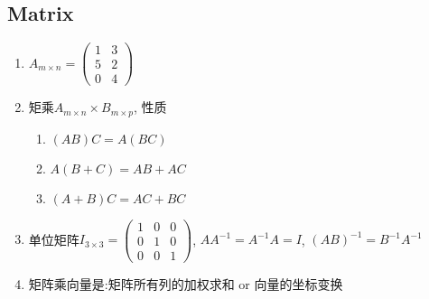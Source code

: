     \subsection{Matrix}
    \begin{enumerate}
        \item $A_{m\times n}=\begin{pmatrix}
            1&3 \\
            5&2 \\
            0&4
            \end{pmatrix}$
        \item 矩乘$A_{m \times n }\times B_{m\times p}$, 性质
        \begin{enumerate}
            \item $(AB)C=A(BC)$
            \item $A(B+C)=AB+AC$
            \item $(A+B)C=AC+BC$
        \end{enumerate}
        \item 单位矩阵$I_{3\times 3}=\begin{pmatrix}
            1&0&0\\
            0&1&0\\
            0&0&1
        \end{pmatrix}$, $AA^{-1}=A^{-1}A=I$, $(AB)^{-1}=B^{-1}A^{-1}$
        \item 矩阵乘向量是:矩阵所有列的加权求和 or 向量的坐标变换
        

\end{enumerate}
